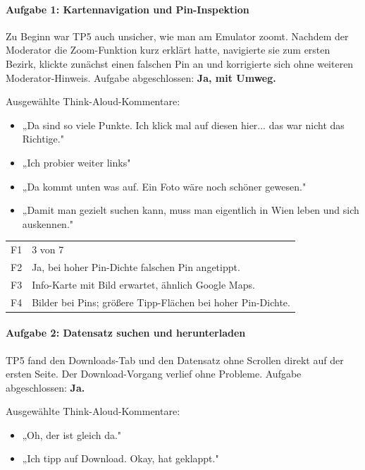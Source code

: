 \documentclass{article}
\begin{document}
\paragraph{Aufgabe 1: Kartennavigation und Pin-Inspektion}

Zu Beginn war TP5 auch unsicher, wie man am Emulator zoomt. Nachdem der
Moderator die Zoom-Funktion kurz erklärt hatte, navigierte sie zum ersten
Bezirk, klickte zunächst einen falschen Pin an und korrigierte sich ohne
weiteren Moderator-Hinweis.
Aufgabe abgeschlossen: \textbf{Ja, mit Umweg.} 

Ausgewählte Think-Aloud-Kommentare:
\begin{itemize}
  \item „Da sind so viele Punkte. Ich klick mal auf diesen hier... das war nicht das Richtige."
  \item „Ich probier weiter links"
  \item „Da kommt unten was auf. Ein Foto wäre noch schöner gewesen."
  \item „Damit man gezielt suchen kann, muss man eigentlich in Wien leben
        und sich auskennen."
\end{itemize}

\begin{tabular}{@{}lp{10cm}@{}}
  F1 & 3 von 7 \\
  F2 & Ja, bei hoher Pin-Dichte falschen Pin angetippt. \\
  F3 & Info-Karte mit Bild erwartet, ähnlich Google Maps. \\
  F4 & Bilder bei Pins; größere Tipp-Flächen bei hoher Pin-Dichte. \\
\end{tabular}

\paragraph{Aufgabe 2: Datensatz suchen und herunterladen}

TP5 fand den Downloads-Tab und den Datensatz ohne Scrollen direkt auf
der ersten Seite. Der Download-Vorgang verlief ohne Probleme.
Aufgabe abgeschlossen: \textbf{Ja.} 

Ausgewählte Think-Aloud-Kommentare:
\begin{itemize}
  \item „Oh, der ist gleich da."
  \item „Ich tipp auf Download. Okay, hat geklappt."
\end{itemize}
\end{document}
